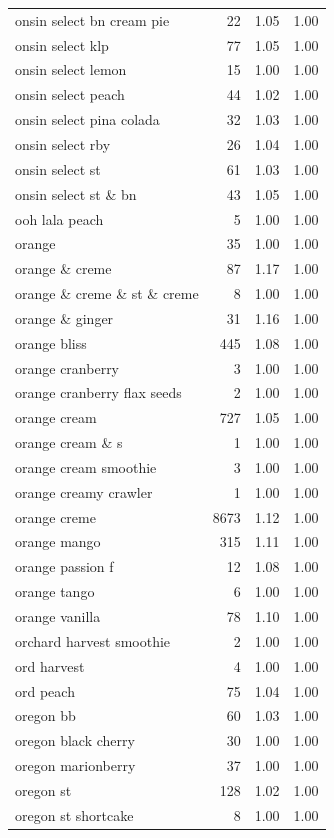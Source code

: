 \begin{table}
\begin{tabular}{lrrr}
onsin select bn cream pie & 22 & 1.05 & 1.00 \\
onsin select klp & 77 & 1.05 & 1.00 \\
onsin select lemon & 15 & 1.00 & 1.00 \\
onsin select peach & 44 & 1.02 & 1.00 \\
onsin select pina colada & 32 & 1.03 & 1.00 \\
onsin select rby & 26 & 1.04 & 1.00 \\
onsin select st & 61 & 1.03 & 1.00 \\
onsin select st \& bn & 43 & 1.05 & 1.00 \\
ooh lala peach & 5 & 1.00 & 1.00 \\
orange & 35 & 1.00 & 1.00 \\
orange \& creme & 87 & 1.17 & 1.00 \\
orange \& creme \& st \& creme & 8 & 1.00 & 1.00 \\
orange \& ginger & 31 & 1.16 & 1.00 \\
orange bliss & 445 & 1.08 & 1.00 \\
orange cranberry & 3 & 1.00 & 1.00 \\
orange cranberry flax seeds & 2 & 1.00 & 1.00 \\
orange cream & 727 & 1.05 & 1.00 \\
orange cream \& s & 1 & 1.00 & 1.00 \\
orange cream smoothie & 3 & 1.00 & 1.00 \\
orange creamy crawler & 1 & 1.00 & 1.00 \\
orange creme & 8673 & 1.12 & 1.00 \\
orange mango & 315 & 1.11 & 1.00 \\
orange passion f & 12 & 1.08 & 1.00 \\
orange tango & 6 & 1.00 & 1.00 \\
orange vanilla & 78 & 1.10 & 1.00 \\
orchard harvest smoothie & 2 & 1.00 & 1.00 \\
ord harvest & 4 & 1.00 & 1.00 \\
ord peach & 75 & 1.04 & 1.00 \\
oregon bb & 60 & 1.03 & 1.00 \\
oregon black cherry & 30 & 1.00 & 1.00 \\
oregon marionberry & 37 & 1.00 & 1.00 \\
oregon st & 128 & 1.02 & 1.00 \\
oregon st shortcake & 8 & 1.00 & 1.00 \\

\end{tabular}
\end{table}

